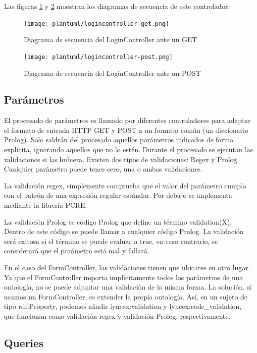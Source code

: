 \documentclass[openright,twoside,12pt]{book}
\begin{document}
Las figuras \ref{fig:logincontrollerget} y \ref{fig:logincontrollerpost} muestran los diagramas de secuencia de este controlador.

\begin{figure}
    \centering
    \texttt{[image: plantuml/logincontroller-get.png]}
    \caption{Diagrama de secuencia del LoginController ante un GET}
    \label{fig:logincontrollerget}
\end{figure}

\begin{figure}[h]
    \centering
    \texttt{[image: plantuml/logincontroller-post.png]}
    \caption{Diagrama de secuencia del LoginController ante un POST}
    \label{fig:logincontrollerpost}
\end{figure}

\subsection{Parámetros}
El procesado de parámetros es llamado por diferentes controladores para adaptar el formato de entrada HTTP GET y POST a un formato común (un diccionario Prolog).
Solo saldrán del procesado aquellos parámetros indicados de forma explícita, ignorando aquellos que no lo estén.
Durante el procesado se ejecutan las validaciones si las hubiera. Existen dos tipos de validaciones: Regex y Prolog.
Cualquier parámetro puede tener cero, una o ambas validaciones.

La validación regex, simplemente comprueba que el valor del parámetro cumpla con el patrón de una expresión regular estándar. Por debajo se implementa mediante la librería PCRE.

La validación Prolog es código Prolog que define un término validation(X). Dentro de este código se puede llamar a cualquier código Prolog.
La validación será exitosa si el término se puede evaluar a true, en caso contrario, se considerará que el parámetro está mal y fallará.

En el caso del FormController, las validaciones tienen que ubicarse en otro lugar. Ya que el FormController importa implícitamente todos los parámetros de una ontología, no se puede adjuntar una validación de la misma forma.
La solución, si usamos un FormController, es extender la propia ontología.
Así, en un sujeto de tipo rdf:Property, podemos añadir lyncex:validation y lyncex:code\_validation, que funcionan como validación regex y validación Prolog, respectivamente.

\subsection{Queries}
\end{document}
